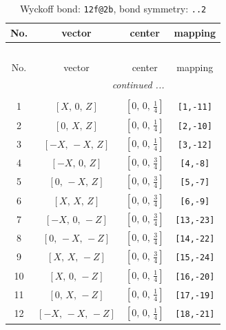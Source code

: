 \documentclass[fleqn,8pt]{jsarticle}
\begin{document}
\renewcommand{\arraystretch}{1.2}
\begin{longtable}{cccc}
\caption{Wyckoff bond: {\tt 12f@2b}, bond symmetry: {\tt ..2}}
 \\
 \hline \hline
No. & vector & center & mapping \\ \hline \endfirsthead

\multicolumn{3}{l}{\tablename\ \thetable{}} \\
 \hline \hline
No. & vector & center & mapping \\ \hline \endhead

 \hline \hline
\multicolumn{3}{r}{\footnotesize\it continued ...} \\ \endfoot

 \hline \hline
\multicolumn{3}{r}{} \\ \endlastfoot

1 & $\left[ X,\, 0,\, Z \right]$ & $\left[ 0,\, 0,\, \frac{1}{4} \right]$ & {\tt [1,-11]} \\ \hline
2 & $\left[ 0,\, X,\, Z \right]$ & $\left[ 0,\, 0,\, \frac{1}{4} \right]$ & {\tt [2,-10]} \\ \hline
3 & $\left[ - X,\, - X,\, Z \right]$ & $\left[ 0,\, 0,\, \frac{1}{4} \right]$ & {\tt [3,-12]} \\ \hline
4 & $\left[ - X,\, 0,\, Z \right]$ & $\left[ 0,\, 0,\, \frac{3}{4} \right]$ & {\tt [4,-8]} \\ \hline
5 & $\left[ 0,\, - X,\, Z \right]$ & $\left[ 0,\, 0,\, \frac{3}{4} \right]$ & {\tt [5,-7]} \\ \hline
6 & $\left[ X,\, X,\, Z \right]$ & $\left[ 0,\, 0,\, \frac{3}{4} \right]$ & {\tt [6,-9]} \\ \hline
7 & $\left[ - X,\, 0,\, - Z \right]$ & $\left[ 0,\, 0,\, \frac{3}{4} \right]$ & {\tt [13,-23]} \\ \hline
8 & $\left[ 0,\, - X,\, - Z \right]$ & $\left[ 0,\, 0,\, \frac{3}{4} \right]$ & {\tt [14,-22]} \\ \hline
9 & $\left[ X,\, X,\, - Z \right]$ & $\left[ 0,\, 0,\, \frac{3}{4} \right]$ & {\tt [15,-24]} \\ \hline
10 & $\left[ X,\, 0,\, - Z \right]$ & $\left[ 0,\, 0,\, \frac{1}{4} \right]$ & {\tt [16,-20]} \\ \hline
11 & $\left[ 0,\, X,\, - Z \right]$ & $\left[ 0,\, 0,\, \frac{1}{4} \right]$ & {\tt [17,-19]} \\ \hline
12 & $\left[ - X,\, - X,\, - Z \right]$ & $\left[ 0,\, 0,\, \frac{1}{4} \right]$ & {\tt [18,-21]} \\
\end{longtable}
\end{document}
